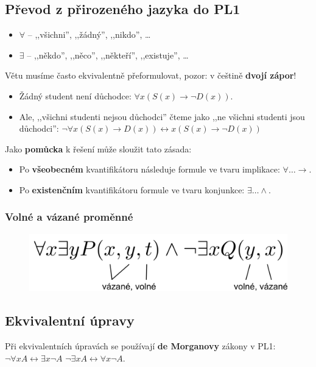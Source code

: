 \subsection{Převod z přirozeného jazyka do PL1}
\begin{itemize}
\item $\forall$ -- ,,všichni'', ,,žádný'', ,,nikdo'', \ldots
\item $\exists$ --  ,,někdo'', ,,něco'', ,,někteří'', ,,existuje'', \ldots
\end{itemize}

\noindent Větu musíme často ekvivalentně přeformulovat, pozor: v češtině \textbf{dvojí zápor}!
\begin{itemize}
\item Žádný student není důchodce: $\forall x (S(x) \rightarrow \neg D(x))$.
\item Ale, ,,všichni studenti nejsou důchodci'' čteme jako ,,ne všichni studenti jsou důchodci'': 
$\neg \forall x (S(x) \rightarrow D(x)) \leftrightarrow x (S(x) \rightarrow \neg D(x))$
\end{itemize}

\noindent Jako \textbf{pomůcka} k řešení může sloužit tato zásada:
\begin{itemize}
\item Po \textbf{všeobecném} kvantifikátoru následuje formule ve tvaru implikace: $\forall \ldots \rightarrow$.
\item Po \textbf{existenčním} kvantifikátoru formule ve tvaru konjunkce:  $\exists \ldots \land$.
\end{itemize}

\subsubsection{Volné a vázané proměnné}
\begin{figure}[H]
	\centering
	\includegraphics[width=.6\textwidth]{assets/volne_vazane}
\end{figure}

\subsection{Ekvivalentní úpravy}
Při ekvivalentních úpravách se používají \textbf{de Morganovy} zákony v PL1: $\neg \forall xA \leftrightarrow \exists x\neg A$ \qquad $\neg \exists xA \leftrightarrow \forall x\neg A$.

